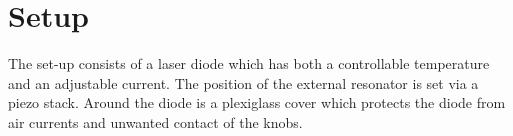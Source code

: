 \section{Setup}
\label{sec:setup}

The set-up consists of a laser diode which has both a controllable temperature and an adjustable current.
The position of the external resonator is set via a piezo stack.
Around the diode is a plexiglass cover which protects the diode from air currents and unwanted contact of the knobs.

